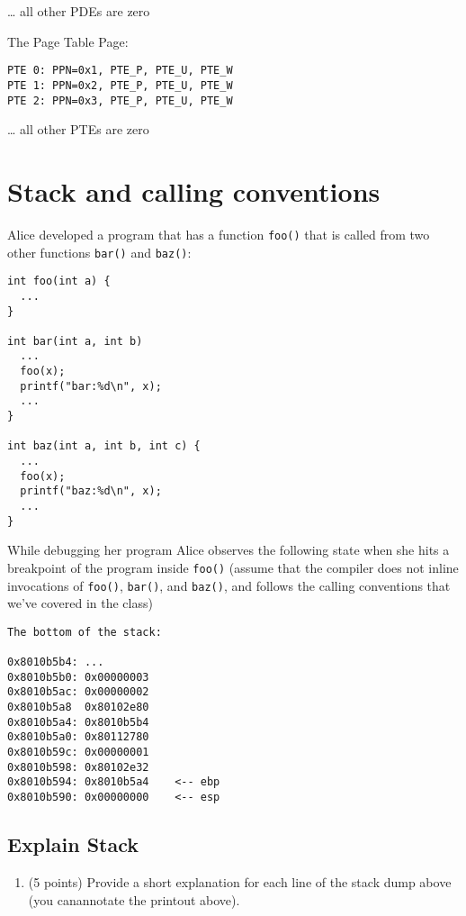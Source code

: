 \documentclass[]{article}
\providecommand{\tightlist}{%
  \setlength{\itemsep}{0pt}\setlength{\parskip}{0pt}}
\begin{document}
\ldots{} all other PDEs are zero

The Page Table Page:

\begin{verbatim}
PTE 0: PPN=0x1, PTE_P, PTE_U, PTE_W
PTE 1: PPN=0x2, PTE_P, PTE_U, PTE_W
PTE 2: PPN=0x3, PTE_P, PTE_U, PTE_W
\end{verbatim}

\ldots{} all other PTEs are zero

\hypertarget{stack-and-calling-conventions}{%
\section{Stack and calling
conventions}\label{stack-and-calling-conventions}}

Alice developed a program that has a function \texttt{foo()} that is
called from two other functions \texttt{bar()} and \texttt{baz()}:

\begin{verbatim}
int foo(int a) {
  ...
}

int bar(int a, int b) 
  ...
  foo(x);
  printf("bar:%d\n", x);
  ...
}

int baz(int a, int b, int c) {
  ...
  foo(x);
  printf("baz:%d\n", x);
  ...
}
\end{verbatim}

While debugging her program Alice observes the following state when she
hits a breakpoint of the program inside \texttt{foo()} (assume that the
compiler does not inline invocations of \texttt{foo()}, \texttt{bar()},
and \texttt{baz()}, and follows the calling conventions that we've
covered in the class)

\begin{verbatim}
The bottom of the stack:

0x8010b5b4: ...
0x8010b5b0: 0x00000003
0x8010b5ac: 0x00000002
0x8010b5a8  0x80102e80
0x8010b5a4: 0x8010b5b4
0x8010b5a0: 0x80112780
0x8010b59c: 0x00000001
0x8010b598: 0x80102e32
0x8010b594: 0x8010b5a4    <-- ebp
0x8010b590: 0x00000000    <-- esp
\end{verbatim}

\hypertarget{explain-stack}{%
\subsection{Explain Stack}\label{explain-stack}}

\begin{enumerate}
\def\labelenumi{(\alph{enumi})}
\tightlist
\item
  (5 points) Provide a short explanation for each line of the stack dump
  above (you canannotate the printout above).
\end{enumerate}
\end{document}
